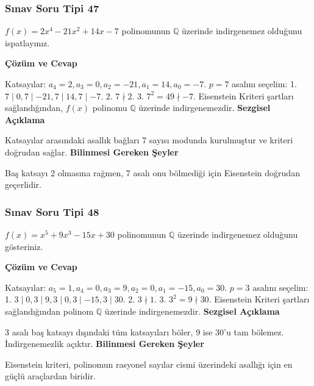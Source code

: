 \documentclass[11pt, a4paper]{article}
\newenvironment{cozum}{
    \vspace{0.5cm}
    \noindent\textcolor{green!60!black}{\faCheckCircle\enspace \textbf{\Large Çözüm ve Cevap}}\par\vspace{0.2cm}
}{}
\newenvironment{sezgisel}{
    \vspace{0.5cm}
    \noindent\textcolor{orange!80!black}{\faLightbulb\enspace \textbf{\Large Sezgisel Açıklama}}\par\vspace{0.2cm}
    \itshape
}{}
\newenvironment{bilgi}{
    \vspace{0.5cm}
    \noindent\textcolor{red!70!black}{\faExclamationTriangle\enspace \textbf{\Large Bilinmesi Gereken Şeyler}}\par\vspace{0.2cm}
}{}
\begin{document}
\newpage
\subsubsection{Sınav Soru Tipi 47}
\begin{sinavbox}
$f(x) = 2x^4-21x^2+14x-7$ polinomunun $\mathbb{Q}$ üzerinde indirgenemez olduğunu ispatlayınız.
\end{sinavbox}
\begin{cozum}
Katsayılar: $a_4=2, a_3=0, a_2=-21, a_1=14, a_0=-7$.
$p=7$ asalını seçelim:
1. $7 \mid 0, 7 \mid -21, 7 \mid 14, 7 \mid -7$.
2. $7 \nmid 2$.
3. $7^2 = 49 \nmid -7$.
Eisenstein Kriteri şartları sağlandığından, $f(x)$ polinomu $\mathbb{Q}$ üzerinde indirgenemezdir.
\end{cozum}
\begin{sezgisel}
Katsayılar arasındaki asallık bağları 7 sayısı modunda kurulmuştur ve kriteri doğrudan sağlar.
\end{sezgisel}
\begin{bilgi}
Baş katsayı 2 olmasına rağmen, 7 asalı onu bölmediği için Eisenstein doğrudan geçerlidir.
\end{bilgi}

\newpage
\subsubsection{Sınav Soru Tipi 48}
\begin{sinavbox}
$f(x) = x^5+9x^3-15x+30$ polinomunun $\mathbb{Q}$ üzerinde indirgenemez olduğunu gösteriniz.
\end{sinavbox}
\begin{cozum}
Katsayılar: $a_5=1, a_4=0, a_3=9, a_2=0, a_1=-15, a_0=30$.
$p=3$ asalını seçelim:
1. $3 \mid 0, 3 \mid 9, 3 \mid 0, 3 \mid -15, 3 \mid 30$.
2. $3 \nmid 1$.
3. $3^2 = 9 \nmid 30$.
Eisenstein Kriteri şartları sağlandığından polinom $\mathbb{Q}$ üzerinde indirgenemezdir.
\end{cozum}
\begin{sezgisel}
3 asalı baş katsayı dışındaki tüm katsayıları böler, 9 ise 30'u tam bölemez. İndirgenemezlik açıktır.
\end{sezgisel}
\begin{bilgi}
Eisenstein kriteri, polinomun rasyonel sayılar cismi üzerindeki asallığı için en güçlü araçlardan biridir.
\end{bilgi}

\newpage
\end{document}
